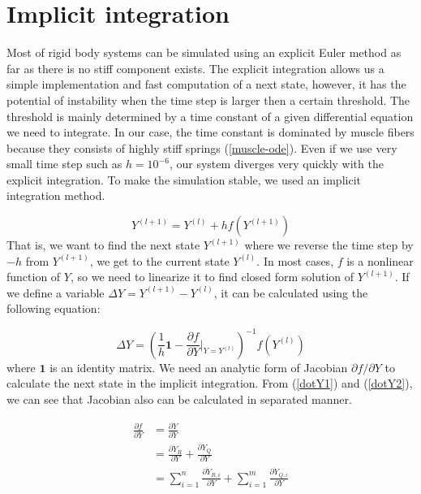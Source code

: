 \documentclass[a4paper,10pt]{article}
\begin{document}
\section{Implicit integration}

Most of rigid body systems can be simulated using an explicit Euler method
as far as there is no stiff component exists. The explicit integration
allows us a simple implementation and fast computation of a next state,
however, it has the potential of instability when the time step is larger
then a certain threshold. The threshold is mainly determined by a time
constant of a given differential equation we need to integrate. In our case, the time
constant is dominated by muscle fibers because they consists
of highly stiff springs (\ref{muscle-ode}). Even if we use very small time step
such as $h=10^{-6}$, our system diverges very quickly with the explicit
integration. To make the simulation stable, we used an implicit integration
method.

\begin{equation}
Y^{(l+1)}=Y^{(l)}+hf(Y^{(l+1)})
\end{equation}
That is, we want to find the next state $Y^{(l+1)}$ where we
reverse the time step by $-h$ from $Y^{(l+1)}$, we get to the current state
$Y^{(l)}$. In most cases, $f$ is a nonlinear function of $Y$, so we need to
linearize it to find closed form solution of $Y^{(l+1)}$. If we define a
variable $\Delta Y = Y^{(l+1)}-Y^{(l)}$, it can be calculated using the
following equation:

\begin{equation}
\Delta Y = \left(  \frac{1}{h}\mathbf{1} - {\frac{\partial f}{\partial Y} \bigg|_{Y=Y^{(l)}}}\right)^{-1} f(Y^{(l)})
\end{equation}
where $\mathbf{1}$ is an identity matrix. We need an analytic form of
Jacobian $\partial f / \partial Y$ to calculate the next state in the
implicit integration. From (\ref{dotY1}) and (\ref{dotY2}), we can see that
Jacobian also can be calculated in separated manner.


\begin{align*}
\frac{\partial f}{\partial Y}
        & = \frac{\partial\dot{Y}}{\partial Y}\\
        & = \frac{\partial\dot{Y}_R}{\partial Y} + \frac{\partial\dot{Y}_Q}{\partial Y}\\
        & = \sum_{i=1}^{n}\frac{\partial\dot{Y}_{R,i}}{\partial Y} + \sum_{i=1}^{m}\frac{\partial\dot{Y}_{Q,i}}{\partial Y}
\end{align*}
\end{document}

